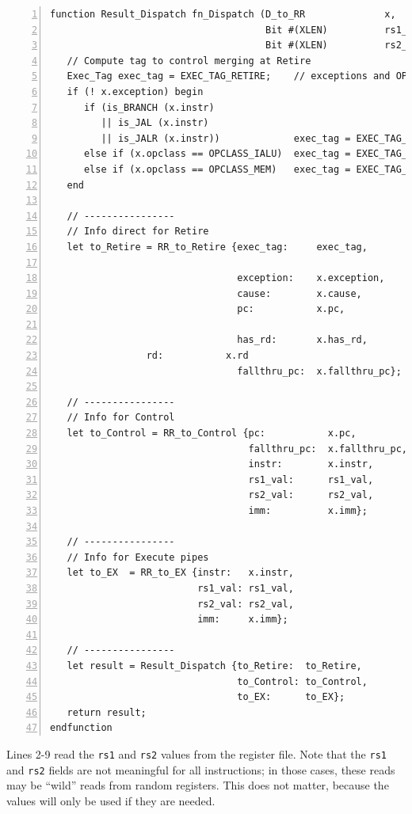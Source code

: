 {\small
\begin{Verbatim}[frame=single, numbers=left]
function Result_Dispatch fn_Dispatch (D_to_RR              x,
                                      Bit #(XLEN)          rs1_val,
                                      Bit #(XLEN)          rs2_val);
   // Compute tag to control merging at Retire
   Exec_Tag exec_tag = EXEC_TAG_RETIRE;    // exceptions and OPCLASS_SYSTEM
   if (! x.exception) begin
      if (is_BRANCH (x.instr)
         || is_JAL (x.instr)
         || is_JALR (x.instr))             exec_tag = EXEC_TAG_CONTROL;
      else if (x.opclass == OPCLASS_IALU)  exec_tag = EXEC_TAG_IALU;
      else if (x.opclass == OPCLASS_MEM)   exec_tag = EXEC_TAG_DMEM;
   end

   // ----------------
   // Info direct for Retire
   let to_Retire = RR_to_Retire {exec_tag:     exec_tag,

                                 exception:    x.exception,
                                 cause:        x.cause,
                                 pc:           x.pc,

                                 has_rd:       x.has_rd,
				 rd:           x.rd
                                 fallthru_pc:  x.fallthru_pc};

   // ----------------
   // Info for Control
   let to_Control = RR_to_Control {pc:           x.pc,
                                   fallthru_pc:  x.fallthru_pc,
                                   instr:        x.instr,
                                   rs1_val:      rs1_val,
                                   rs2_val:      rs2_val,
                                   imm:          x.imm};

   // ----------------
   // Info for Execute pipes
   let to_EX  = RR_to_EX {instr:   x.instr,
                          rs1_val: rs1_val,
                          rs2_val: rs2_val,
                          imm:     x.imm};

   // ----------------
   let result = Result_Dispatch {to_Retire:  to_Retire,
                                 to_Control: to_Control,
                                 to_EX:      to_EX};
   return result;
endfunction
\end{Verbatim}
}

Lines 2-9 read the \verb|rs1| and \verb|rs2| values from the register
file.  Note that the \verb|rs1| and \verb|rs2| fields are not
meaningful for all instructions; in those cases, these reads may be
``wild'' reads from random registers.  This does not matter, because
the values will only be used if they are needed.

